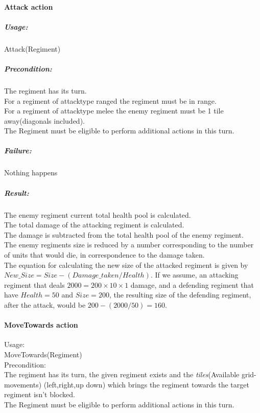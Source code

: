 		\paragraph{Attack action}
		\subparagraph{Usage:} 
		Attack(Regiment) \\
		
		\subparagraph{Precondition:} 
		The regiment has its turn. \\
		For a regiment of attacktype ranged the regiment must be in range. \\
		For a regiment of attacktype melee the enemy regiment must be 1 tile away(diagonals included). \\
		The Regiment must be eligible to perform additional actions in this turn.\\
		
		\subparagraph{Failure:} 
		Nothing happens \\
		
		\subparagraph{Result:} 
		The enemy regiment current total health pool is calculated.\\ 
		The total damage of the attacking regiment is calculated. \\
		The damage is subtracted from the total health pool of the enemy regiment.\\
		The enemy regiments size is reduced by a number corresponding to the number of units that would die, in correspondence to the damage taken.\\
		The equation for calculating the new size of the attacked regiment is given by \\
		$New\_Size = Size - (Damage\_taken / Health)$.
		If we assume, an attacking regiment that deals $2000 = 200 \times 10 \times 1$ damage, and a defending regiment that have $Health = 50$ and $Size = 200$, the resulting size of the defending regiment, after the attack, would be $200-(2000/50)=160$.
		
		\paragraph{MoveTowards action}
		Usage: \\
		MoveTowards(Regiment) \\
		
		Precondition: \\
		The regiment has its turn, the given regiment exists and the \textit{tiles}(Available grid-movements) (left,right,up down) 
		which brings the regiment towards the target regiment isn't blocked.\\
		The Regiment must be eligible to perform additional actions in this turn.\\
		
